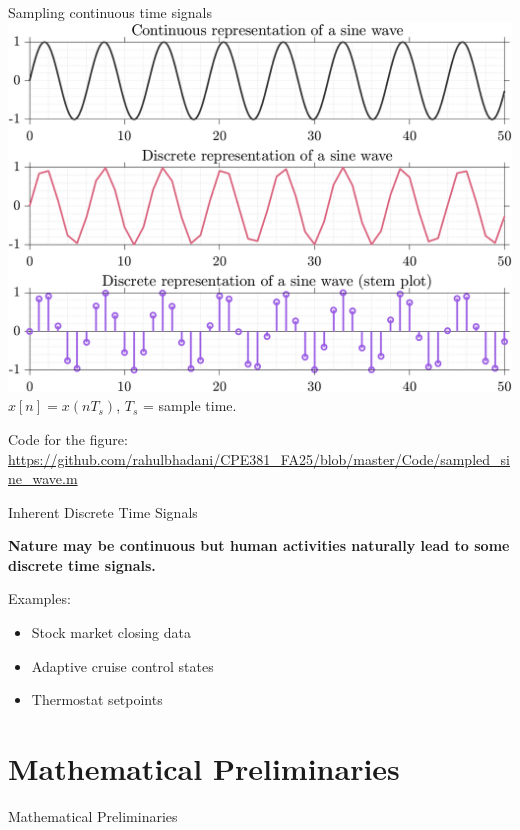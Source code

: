 \documentclass[aspectratio=169,xcolor=dvipsnames,svgnames,x11names,fleqn]{beamer}
\begin{document}
\begin{frame}{Sampling continuous time signals}
\centering
    \includegraphics[width=0.55\linewidth, trim=0 0 0 0cm,clip]{figures/sampled_sine_wave.png} $x[n] = x(nT_s)$,
$T_s$ = sample time.
    
    \tiny
    Code for the figure: \url{https://github.com/rahulbhadani/CPE381_FA25/blob/master/Code/sampled_sine_wave.m}
\end{frame}

\begin{frame}{Inherent Discrete Time Signals}
    \begin{center}
         \textbf{Nature may be continuous but human activities naturally lead to some discrete time signals.} 
    \end{center}
   
    
    Examples:
    \begin{itemize}
        \item Stock market closing data
        \item Adaptive cruise control states
        \item Thermostat setpoints
    \end{itemize}
\end{frame}

\section{Mathematical Preliminaries}


\begin{frame}{}
    \begin{center}
    \Huge \bf \color{DarkBlue}
    \faCalculator
    
    Mathematical Preliminaries
\end{center}
\end{frame}
\end{document}
